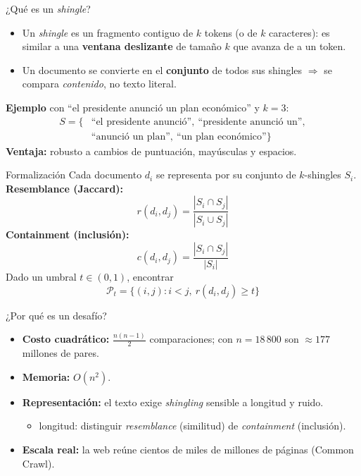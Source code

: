 \documentclass[aspectratio=169,11pt]{beamer}
\begin{document}
\begin{frame}{¿Qué es un \emph{shingle}?}
  \begin{itemize}
    \item Un \emph{shingle} es un fragmento contiguo de $k$ tokens
          (o de $k$ caracteres): es similar a una \textbf{ventana deslizante}
          de tamaño $k$ que avanza de a un token.
    \item Un documento se convierte en el \textbf{conjunto} de todos sus
          shingles $\Rightarrow$ se compara \emph{contenido}, no texto literal.
  \end{itemize}
  \vfill
  \textbf{Ejemplo} con ``el presidente anunció un plan económico'' y $k=3$:
  \[
    \begin{aligned}
      S = \{ & \text{``el presidente anunció''},\ \text{``presidente anunció un''},\\
             & \text{``anunció un plan''},\ \text{``un plan económico''} \}
    \end{aligned}
  \]
  \vfill
  \textbf{Ventaja:} robusto a cambios de puntuación, mayúsculas y espacios.
\end{frame}

\begin{frame}{Formalización}
  Cada documento $d_i$ se representa por su conjunto de $k$-shingles $S_i$.
  \vfill
  \textbf{Resemblance (Jaccard):}
  \[
    r(d_i,d_j)=\frac{|S_i\cap S_j|}{|S_i\cup S_j|}
  \]
  \textbf{Containment (inclusión):}
  \[
    c(d_i,d_j)=\frac{|S_i\cap S_j|}{|S_i|}
  \]
  \vfill
  Dado un umbral $t\in(0,1)$, encontrar
  \[
    \mathcal{P}_t=\{(i,j): i<j,\ r(d_i,d_j)\ge t\}
  \]
\end{frame}

\begin{frame}{¿Por qué es un desafío?}
  \begin{itemize}
    \item \textbf{Costo cuadrático:} $\tfrac{n(n-1)}{2}$ comparaciones;
          con $n=18\,800$ son $\approx 177$ millones de pares.
    \item \textbf{Memoria:} $O(n^2)$.
    \item \textbf{Representación:} el texto exige \emph{shingling} sensible a
          longitud y ruido.
          \begin{itemize}
            \item longitud: distinguir \emph{resemblance} (similitud)
                  de \emph{containment} (inclusión).
          \end{itemize}
    \item \textbf{Escala real:} la web reúne cientos de miles de millones de
          páginas (Common Crawl).
  \end{itemize}
\end{frame}
\end{document}
